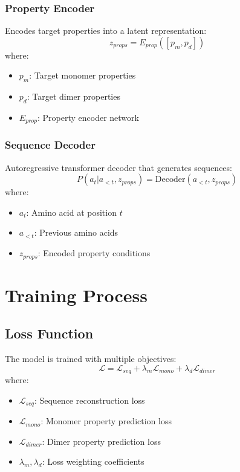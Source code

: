 \documentclass[11pt]{article}
\begin{document}
\subsubsection{Property Encoder}
Encodes target properties into a latent representation:
\begin{equation}
    z_{props} = E_{prop}([p_m, p_d])
\end{equation}
where:
\begin{itemize}
    \item $p_m$: Target monomer properties
    \item $p_d$: Target dimer properties
    \item $E_{prop}$: Property encoder network
\end{itemize}

\subsubsection{Sequence Decoder}
Autoregressive transformer decoder that generates sequences:
\begin{equation}
    P(a_t|a_{<t}, z_{props}) = \text{Decoder}(a_{<t}, z_{props})
\end{equation}
where:
\begin{itemize}
    \item $a_t$: Amino acid at position $t$
    \item $a_{<t}$: Previous amino acids
    \item $z_{props}$: Encoded property conditions
\end{itemize}

\section{Training Process}

\subsection{Loss Function}
The model is trained with multiple objectives:
\begin{equation}
    \mathcal{L} = \mathcal{L}_{seq} + \lambda_m\mathcal{L}_{mono} + \lambda_d\mathcal{L}_{dimer}
\end{equation}
where:
\begin{itemize}
    \item $\mathcal{L}_{seq}$: Sequence reconstruction loss
    \item $\mathcal{L}_{mono}$: Monomer property prediction loss
    \item $\mathcal{L}_{dimer}$: Dimer property prediction loss
    \item $\lambda_m, \lambda_d$: Loss weighting coefficients
\end{itemize}
\end{document}
